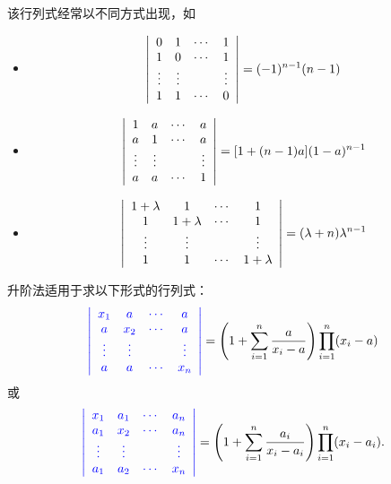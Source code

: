 \begin{frame}
 
  该行列式经常以不同方式出现，如
  \begin{itemize}
  \item
    $$
    \left|
      \begin{array}{cccc}
        0  &  1  & \cdots & 1   \\
        1  &  0  & \cdots & 1   \\
        \vdots& \vdots &     & \vdots \\
        1  &  1  & \cdots & 0 
      \end{array}
    \right|   = (-1)^{n-1}(n-1)
    $$ 
  \item
    $$
    \left|
      \begin{array}{cccc}
        1  &  a  & \cdots & a   \\
        a  &  1  & \cdots & a   \\
        \vdots& \vdots &     & \vdots \\
        a  &  a  & \cdots & 1
      \end{array}
    \right| 
    = [1+(n-1)a](1-a)^{n-1}
    $$ 
  \item
    $$
    \left|
      \begin{array}{cccc}
        1+\lambda  &  1  & \cdots & 1   \\
        1  &  1+\lambda  & \cdots & 1   \\
        \vdots& \vdots &     & \vdots \\
        1  &  1  & \cdots & 1+\lambda 
      \end{array}
    \right| 
    = (\lambda+n)\lambda^{n-1}
    $$
  \end{itemize}
\end{frame}

\begin{frame}

  升阶法适用于求以下形式的行列式：
  $$
  \textcolor{blue}{\left|
    \begin{array}{cccc}
      x_1 &  a  & \cdots & a   \\
      a   & x_2 & \cdots & a   \\
      \vdots & \vdots &     & \vdots \\
      a   &  a  & \cdots & x_n
    \end{array}
  \right|}=   \left(1+\sum_{i=1}^n \frac{a}{x_i-a}\right)\prod_{i=1}^n(x_i-a)
  $$
  或
  $$
  \textcolor{blue}{\left|
    \begin{array}{cccc}
      x_1 & a_1  & \cdots & a_n   \\
      a_1 & x_2 & \cdots  & a_n   \\
      \vdots & \vdots &     & \vdots \\
      a_1 & a_2  & \cdots & x_n
    \end{array}
  \right|}=  \left(1+\sum_{i=1}^n \frac{a_i}{x_i-a_i}\right)\prod_{i=1}^n(x_i-a_i).
  $$      
 
\end{frame}

